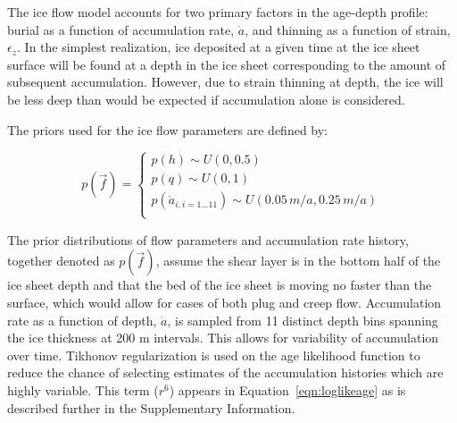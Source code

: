 The ice flow model accounts for two primary factors in the age-depth profile: burial as a function of accumulation rate, $\dot{a}$, and thinning as a function of strain, $\epsilon_z$. In the simplest realization, ice deposited at a given time at the ice sheet surface will be found at a depth in the ice sheet corresponding to the amount of subsequent accumulation. However, due to strain thinning at depth, the ice will be less deep than would be expected if accumulation alone is considered. 


The priors used for the ice flow parameters are defined by:

\begin{center}
\begin{equation}\label{priors}
p(\vec{f}) = 
\begin{cases}
p(h) \sim U(0, 0.5) \\
p(q) \sim U (0, 1) \\
p(\dot{a}_{i, i=1...11}) \sim U(0.05\,m/a,0.25\,m/a)\\
\end{cases}	
\end{equation}	
\end{center}

The prior distributions of flow parameters and accumulation rate history, together denoted as $p(\vec{f})$, assume the shear layer is in the bottom half of the ice sheet depth \citep{cuffey2010} and that the bed of the ice sheet is moving no faster than the surface, which would allow for cases of both plug and creep flow. Accumulation rate as a function of depth, $\dot{a}$, is sampled from 11 distinct depth bins spanning the ice thickness at 200 m intervals. This allows for variability of accumulation over time. Tikhonov regularization is used on the age likelihood function to reduce the chance of selecting estimates of the accumulation histories which are highly variable. This term ($r^6$) appears in Equation~\ref{eqn:loglikeage} as is described further in the Supplementary Information.
